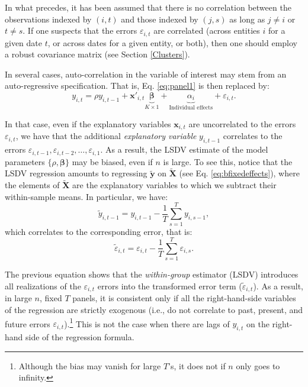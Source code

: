 \documentclass[
  12pt,
]{book}
\theoremstyle{definition}
\theoremstyle{definition}
\theoremstyle{definition}
\theoremstyle{definition}
\theoremstyle{remark}
\begin{document}
In what precedes, it has been assumed that there is no correlation between the observations indexed by \((i,t)\) and those indexed by \((j,s)\) as long as \(j \ne i\) or \(t \ne s\). If one suspects that the errors \(\varepsilon_{i,t}\) are correlated (across entities \(i\) for a given date \(t\), or across dates for a given entity, or both), then one should employ a robust covariance matrix (see Section \ref{Clusters}).

In several cases, auto-correlation in the variable of interest may stem from an auto-regressive specification. That is, Eq. \eqref{eq:panel1} is then replaced by:
\begin{equation}
y_{i,t} = \rho y_{i,t-1} + \mathbf{x}'_{i,t}\underbrace{\boldsymbol\beta}_{K \times 1} + \underbrace{\alpha_i}_{\mbox{Individual effects}} + \varepsilon_{i,t}.\label{eq:paneldyn}
\end{equation}

In that case, even if the explanatory variables \(\mathbf{x}_{i,t}\) are uncorrelated to the errors \(\varepsilon_{i,t}\), we have that the additional \emph{explanatory variable} \(y_{i,t-1}\) correlates to the errors \(\varepsilon_{i,t-1},\varepsilon_{i,t-2},\dots,\varepsilon_{i,1}\). As a result, the LSDV estimate of the model parameters \(\{\rho,\boldsymbol\beta\}\) may be biased, even if \(n\) is large. To see this, notice that the LSDV regression amounts to regressing \(\widetilde{\mathbf{y}}\) on \(\widetilde{\mathbf{X}}\) (see Eq. \eqref{eq:bfixedeffects}), where the elements of \(\widetilde{\mathbf{X}}\) are the explanatory variables to which we subtract their within-sample means. In particular, we have:
\[
\tilde{y}_{i,t-1} = y_{i,t-1} - \frac{1}{T} \sum_{s=1}^{T} y_{i,s-1},
\]
which correlates to the corresponding error, that is:
\[
\tilde{\varepsilon}_{i,t} = \varepsilon_{i,t} - \frac{1}{T} \sum_{s=1}^{T} \varepsilon_{i,s}.
\]

The previous equation shows that the \emph{within-group} estimator (LSDV) introduces all realizations of the \(\varepsilon_{i,t}\) errors into the transformed error term (\(\tilde{\varepsilon}_{i,t}\)). As a result, in large \(n\), fixed \(T\) panels, it is consistent only if all the right-hand-side variables of the regression are strictly exogenous (i.e., do not correlate to past, present, and future errors \(\varepsilon_{i,t}\)).\footnote{Although the bias may vanish for large \(T\)'s, it does not if \(n\) only goes to infinity.} This is not the case when there are lags of \(y_{i,t}\) on the right-hand side of the regression formula.
\end{document}
